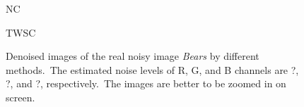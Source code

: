 \begin{figure}
{\begin{minipage}[t]{0.24\textwidth}
{\footnotesize NC}
\end{minipage}
\begin{minipage}[t]{0.24\textwidth}
\centering
{}
{\footnotesize TWSC}
\end{minipage}
}
    \caption{Denoised images of the real noisy image \textsl{Bears} \cite{ncwebsite} by different methods.\ The estimated noise levels of R, G, and B channels are ?, ?, and ?, respectively.\ The images are better to be zoomed in on screen.}
    \label{fig5-8}
\end{figure}


